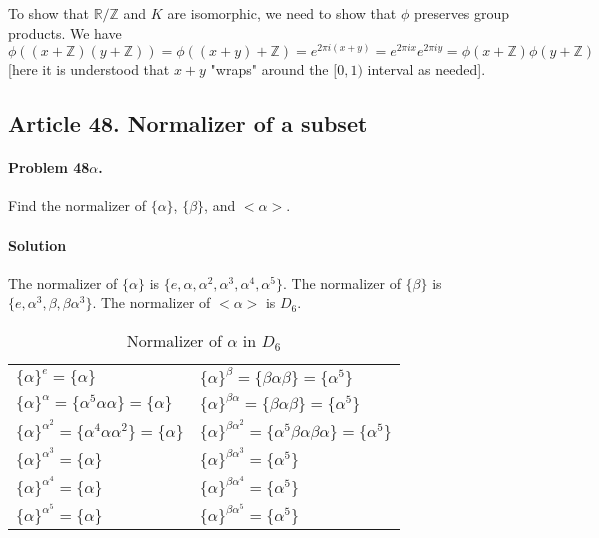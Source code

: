 To show that $\mathbb{R/Z}$ and $K$ are isomorphic, we need to show that $\phi$
preserves group products. We have
$ \phi ((x+\mathbb{Z})(y+\mathbb{Z})) = \phi ((x+y)+\mathbb{Z}) = e^{2\pi i (x+y)}
= e^{2\pi i x}e^{2 \pi i y} = \phi (x+\mathbb{Z}) \phi (y+\mathbb{Z})$ [here it
is understood that $x+y$ "wraps" around the $[0,1)$ interval as needed].

\subsection{Article 48. Normalizer of a subset}

\paragraph{Problem 48$\alpha$.}
Find the normalizer of $\{\alpha\}$, $\{\beta\}$, and $<\alpha>$.

\paragraph*{Solution}
The normalizer of $\{\alpha\}$ is $\{e, \alpha, \alpha^2, \alpha^3,
\alpha^4, \alpha^5\}$.
The normalizer of $\{\beta\}$ is $\{e, \alpha^3,
\beta, \beta\alpha^3\}$.
The normalizer of $<\alpha>$ is $D_6$.

\begin{table}[ht]
\begin{center}
\begin{tabular}[ht]{ll}
$\{\alpha\}^e = \{\alpha\}$  &
  $\{\alpha\}^\beta = \{\beta \alpha \beta\} = \{\alpha^5\}$ \\
$\{\alpha\}^{\alpha} = \{\alpha^5 \alpha \alpha\} = \{\alpha\}$
  &  $\{\alpha\}^{\beta\alpha} = \{\beta \alpha \beta\} = \{\alpha^5\}$ \\
$\{\alpha\}^{\alpha^2} = \{\alpha^4 \alpha \alpha^2\} = \{\alpha\}$
  &  $\{\alpha\}^{\beta\alpha^2} = \{\alpha^5 \beta \alpha \beta \alpha\} = \{\alpha^5\}$ \\
$\{\alpha\}^{\alpha^3} = \{\alpha\}$
  &  $\{\alpha\}^{\beta\alpha^3} = \{\alpha^5\}$ \\
$\{\alpha\}^{\alpha^4} = \{\alpha\}$
  &  $\{\alpha\}^{\beta\alpha^4} = \{\alpha^5\}$ \\
$\{\alpha\}^{\alpha^5} = \{\alpha\}$
  &  $\{\alpha\}^{\beta\alpha^5} = \{\alpha^5\}$ \\
\end{tabular}
\end{center}
\caption{Normalizer of $\alpha$ in $D_6$}
\label{table:normalizers1_in_d6}
\end{table}

